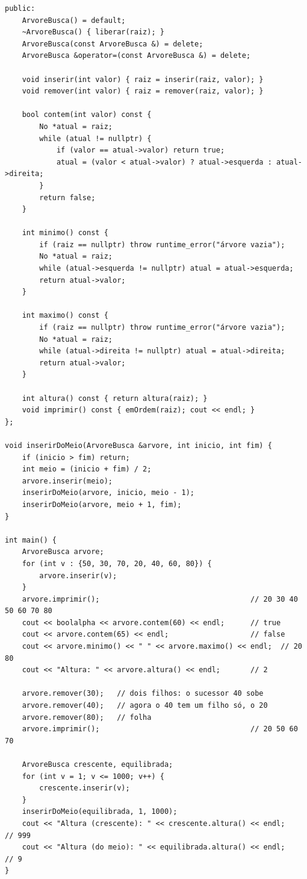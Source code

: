 \begin{codigo}
\begin{Verbatim}[breaklines=true, breaksymbolleft={}, fontsize=\footnotesize]
public:
    ArvoreBusca() = default;
    ~ArvoreBusca() { liberar(raiz); }
    ArvoreBusca(const ArvoreBusca &) = delete;
    ArvoreBusca &operator=(const ArvoreBusca &) = delete;

    void inserir(int valor) { raiz = inserir(raiz, valor); }
    void remover(int valor) { raiz = remover(raiz, valor); }

    bool contem(int valor) const {
        No *atual = raiz;
        while (atual != nullptr) {
            if (valor == atual->valor) return true;
            atual = (valor < atual->valor) ? atual->esquerda : atual->direita;
        }
        return false;
    }

    int minimo() const {
        if (raiz == nullptr) throw runtime_error("árvore vazia");
        No *atual = raiz;
        while (atual->esquerda != nullptr) atual = atual->esquerda;
        return atual->valor;
    }

    int maximo() const {
        if (raiz == nullptr) throw runtime_error("árvore vazia");
        No *atual = raiz;
        while (atual->direita != nullptr) atual = atual->direita;
        return atual->valor;
    }

    int altura() const { return altura(raiz); }
    void imprimir() const { emOrdem(raiz); cout << endl; }
};

void inserirDoMeio(ArvoreBusca &arvore, int inicio, int fim) {
    if (inicio > fim) return;
    int meio = (inicio + fim) / 2;
    arvore.inserir(meio);
    inserirDoMeio(arvore, inicio, meio - 1);
    inserirDoMeio(arvore, meio + 1, fim);
}

int main() {
    ArvoreBusca arvore;
    for (int v : {50, 30, 70, 20, 40, 60, 80}) {
        arvore.inserir(v);
    }
    arvore.imprimir();                                   // 20 30 40 50 60 70 80
    cout << boolalpha << arvore.contem(60) << endl;      // true
    cout << arvore.contem(65) << endl;                   // false
    cout << arvore.minimo() << " " << arvore.maximo() << endl;  // 20 80
    cout << "Altura: " << arvore.altura() << endl;       // 2

    arvore.remover(30);   // dois filhos: o sucessor 40 sobe
    arvore.remover(40);   // agora o 40 tem um filho só, o 20
    arvore.remover(80);   // folha
    arvore.imprimir();                                   // 20 50 60 70

    ArvoreBusca crescente, equilibrada;
    for (int v = 1; v <= 1000; v++) {
        crescente.inserir(v);
    }
    inserirDoMeio(equilibrada, 1, 1000);
    cout << "Altura (crescente): " << crescente.altura() << endl;     // 999
    cout << "Altura (do meio): " << equilibrada.altura() << endl;     // 9
}
\end{Verbatim}
\end{codigo}

